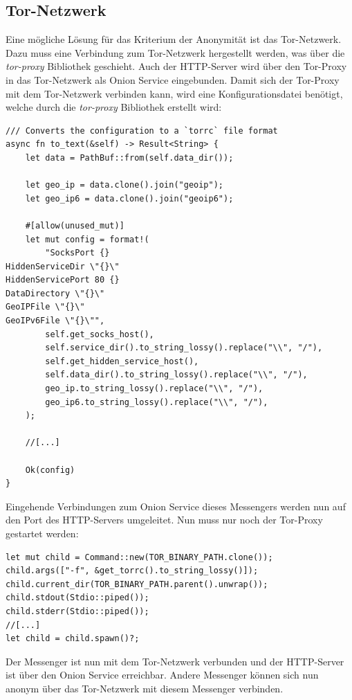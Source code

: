 \documentclass[a4paper,ngerman, headheight=28pt,12pt]{scrartcl}
\begin{document}
\subsection{Tor-Netzwerk}
Eine mögliche Lösung für das Kriterium der Anonymität ist das Tor-Netzwerk. Dazu muss eine Verbindung zum Tor-Netzwerk hergestellt werden, was über die \textit{tor-proxy} Bibliothek geschieht.
Auch der HTTP-Server wird über den Tor-Proxy in das Tor-Netzwerk als Onion Service eingebunden. Damit sich der Tor-Proxy mit dem Tor-Netzwerk verbinden kann, wird eine Konfigurationsdatei benötigt, welche durch die \textit{tor-proxy} Bibliothek erstellt wird:
\begin{verbatim}
/// Converts the configuration to a `torrc` file format
async fn to_text(&self) -> Result<String> {
    let data = PathBuf::from(self.data_dir());

    let geo_ip = data.clone().join("geoip");
    let geo_ip6 = data.clone().join("geoip6");

    #[allow(unused_mut)]
    let mut config = format!(
        "SocksPort {}
HiddenServiceDir \"{}\"
HiddenServicePort 80 {}
DataDirectory \"{}\"
GeoIPFile \"{}\"
GeoIPv6File \"{}\"",
        self.get_socks_host(),
        self.service_dir().to_string_lossy().replace("\\", "/"),
        self.get_hidden_service_host(),
        self.data_dir().to_string_lossy().replace("\\", "/"),
        geo_ip.to_string_lossy().replace("\\", "/"),
        geo_ip6.to_string_lossy().replace("\\", "/"),
    );

    //[...]

    Ok(config)
}
\end{verbatim}
Eingehende Verbindungen zum Onion Service dieses Messengers werden nun auf den Port des HTTP-Servers umgeleitet. Nun muss nur noch der Tor-Proxy gestartet werden:
\begin{verbatim}
let mut child = Command::new(TOR_BINARY_PATH.clone());
child.args(["-f", &get_torrc().to_string_lossy()]);
child.current_dir(TOR_BINARY_PATH.parent().unwrap());
child.stdout(Stdio::piped());
child.stderr(Stdio::piped());
//[...]
let child = child.spawn()?;
\end{verbatim}

Der Messenger ist nun mit dem Tor-Netzwerk verbunden und der HTTP-Server ist über den Onion Service erreichbar. Andere Messenger können sich nun anonym über das Tor-Netzwerk mit diesem Messenger verbinden.
\end{document}
